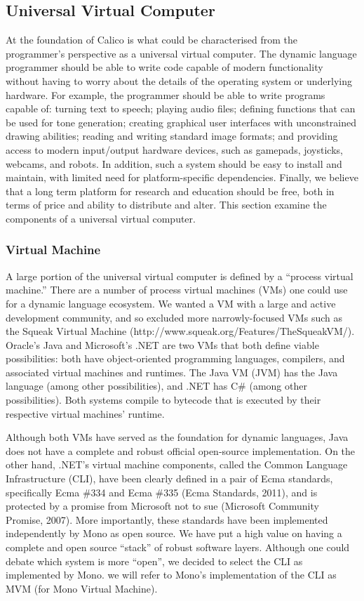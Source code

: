 \documentclass[preprint]{sigplanconf}
\begin{document}
\subsection{Universal Virtual Computer}


At the foundation of Calico is what could be characterised from the programmer's perspective as a universal virtual computer. The dynamic language programmer should be able to write code capable of modern functionality without having to worry about the details of the operating system or underlying hardware. For example, the programmer should be able to write programs capable of: turning text to speech; playing audio files; defining functions that can be used for tone generation; creating graphical user interfaces with unconstrained drawing abilities; reading and writing standard image formats; and providing access to modern input/output hardware devices, such as gamepads, joysticks, webcams, and robots. In addition, such a system should be easy to install and maintain, with limited need for platform-specific dependencies. Finally, we believe that a long term platform for research and education should be free, both in terms of price and ability to distribute and alter. This section examine the components of a universal virtual computer.


\subsubsection{Virtual Machine}


A large portion of the universal virtual computer is defined by a ``process virtual machine.'' There are a number of process virtual machines (VMs) one could use for a dynamic language ecosystem. We wanted a VM with a large and active development community, and so excluded more narrowly-focused VMs such as the Squeak Virtual Machine (http://www.squeak.org/Features/TheSqueakVM/). Oracle's Java and Microsoft's .NET are two VMs that both define viable possibilities: both have object-oriented programming languages, compilers, and associated virtual machines and runtimes. The Java VM (JVM) has the Java language (among other possibilities), and .NET has C\# (among other possibilities). Both systems compile to bytecode that is executed by their respective virtual machines' runtime.  


Although both VMs have served as the foundation for dynamic languages, Java does not have a complete and robust official open-source implementation. On the other hand, .NET’s virtual machine components, called the Common Language Infrastructure (CLI), have been clearly defined in a pair of Ecma standards, specifically Ecma \#334 and Ecma \#335 (Ecma Standards, 2011), and is protected by a promise from Microsoft not to sue (Microsoft Community Promise, 2007). More importantly, these standards have been implemented independently by Mono as open source. We have put a high value on having a complete and open source ``stack'' of robust software layers. Although one could debate which system is more ``open'', we decided to select the CLI as implemented by Mono. we will refer to Mono's implementation of the CLI as MVM (for Mono Virtual Machine).
\end{document}
